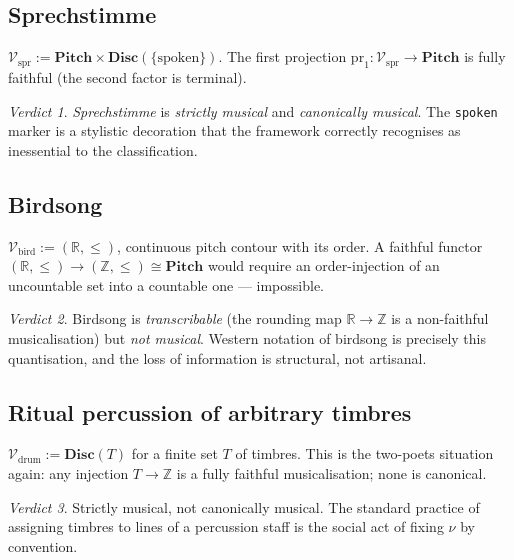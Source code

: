 \documentclass[11pt]{article}
\theoremstyle{definition}
\theoremstyle{plain}
\theoremstyle{remark}
\newtheorem*{verdict}{Verdict}
\newcommand{\V}{\mathcal{V}}
\newcommand{\Pitch}{\mathbf{Pitch}}
\newcommand{\Disc}{\mathbf{Disc}}
\newcommand{\R}{\mathbb{R}}
\newcommand{\Z}{\mathbb{Z}}
\begin{document}
\subsection{Sprechstimme}
$\V_{\mathrm{spr}} := \Pitch \times \Disc(\{\mathrm{spoken}\})$. The
first projection $\mathrm{pr}_1 : \V_{\mathrm{spr}} \to \Pitch$ is
fully faithful (the second factor is terminal).

\begin{verdict}
\emph{Sprechstimme} is \emph{strictly musical} and \emph{canonically
musical}. The \texttt{spoken} marker is a stylistic decoration that
the framework correctly recognises as inessential to the
classification.
\end{verdict}

\subsection{Birdsong}
$\V_{\mathrm{bird}} := (\R, \leq)$, continuous pitch contour with its
order. A faithful functor $(\R, \leq) \to (\Z, \leq) \cong \Pitch$
would require an order-injection of an uncountable set into a
countable one — impossible.

\begin{verdict}
Birdsong is \emph{transcribable} (the rounding map
$\R \to \Z$ is a non-faithful musicalisation) but
\emph{not musical}. Western notation of birdsong is precisely this
quantisation, and the loss of information is structural, not
artisanal.
\end{verdict}

\subsection{Ritual percussion of arbitrary timbres}
$\V_{\mathrm{drum}} := \Disc(T)$ for a finite set $T$ of timbres.
This is the two-poets situation again: any injection $T \to \Z$ is a
fully faithful musicalisation; none is canonical.

\begin{verdict}
Strictly musical, not canonically musical. The standard practice of
assigning timbres to lines of a percussion staff is the social act of
fixing $\nu$ by convention.
\end{verdict}

\end{document}
